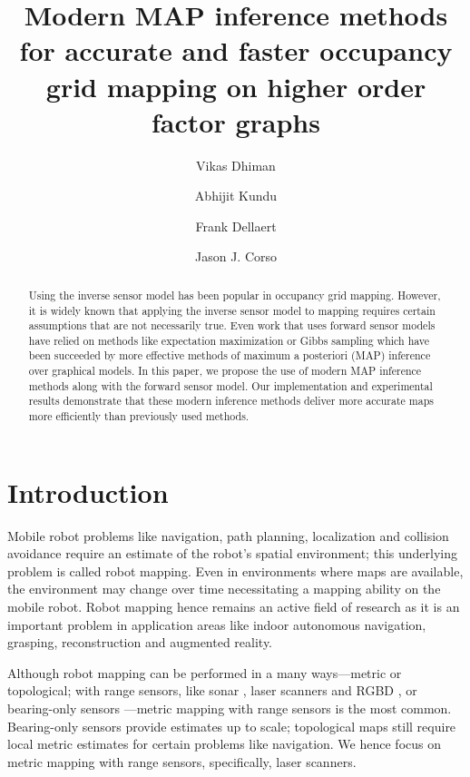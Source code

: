 \documentclass[letterpaper, 10 pt, conference]{ieeeconf} %
\title{\Large \bf
Modern MAP inference methods for accurate and faster occupancy grid mapping on higher
order factor graphs
}
\author[1]{Vikas Dhiman}
\author[2]{Abhijit Kundu}
\author[2]{Frank Dellaert}
\author[1]{Jason J. Corso}
\affil[1]{ Department of Computer Science and Engineering, SUNY at Buffalo, NY, USA }
\affil[1]{{\tt\small\{vikasdhi,jcorso\}@buffalo.edu}}
\affil[2]{College of Computing, Georgia Tech, GA, USA}
\affil[2]{{\tt\small\{abhijit.kundu,frank\}@gatech.edu}}
\begin{document}
\maketitle
\begin{abstract}
Using the inverse sensor model has been popular in occupancy grid mapping. 
However, it is widely known that applying the inverse sensor model to mapping 
requires certain assumptions that are not necessarily true. Even work that uses 
forward sensor models have relied on methods like expectation maximization or 
Gibbs sampling which have been succeeded by more effective methods of maximum a 
posteriori (MAP) inference over graphical models. In this paper, we propose the 
use of modern MAP inference methods along with the forward sensor model.  Our 
implementation and experimental results demonstrate that these modern inference 
methods deliver more accurate maps more efficiently than previously used 
methods.
\end{abstract}
\section{Introduction}

Mobile robot problems like navigation, path planning, localization and collision 
avoidance require an estimate of the robot's spatial environment; this 
underlying problem is called robot mapping\cite{thrun2002robotic}.  Even in 
environments where maps are available, the environment may change over time 
necessitating a mapping ability on the mobile robot.  Robot mapping hence 
remains an active field of research 
\cite{meyer2012occupancy,nagla2012improved,merali2013icra} as it is an important 
problem in application areas like indoor autonomous navigation, grasping, 
reconstruction and augmented reality.

Although robot mapping can be performed in a many ways---metric or topological; 
with range sensors, like sonar \cite{thrun2003learning}, laser scanners 
\cite{thrun2003learning} and RGBD \cite{newcombe2011kinectfusion}, or 
bearing-only sensors \cite{davison2007monoslam,kundu2011realtime}---metric 
mapping with range sensors is the most common.  Bearing-only sensors provide 
estimates up to scale; topological maps still require local metric 
estimates for certain problems like navigation.  We hence focus on metric 
mapping with range sensors, specifically, laser scanners.
\end{document}
